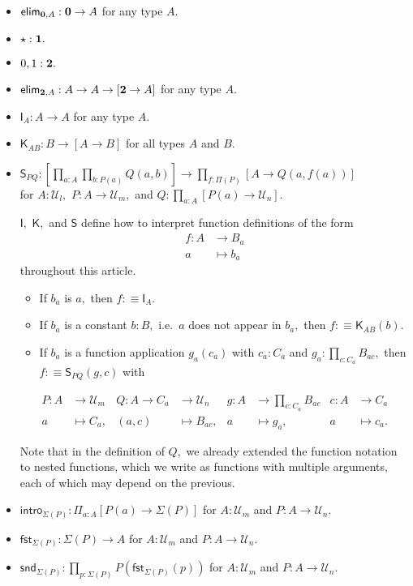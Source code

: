 \documentclass[a4paper]{article}
\theoremstyle{definition}
\theoremstyle{remark}
\let\defeq\equiv
\renewcommand{\equiv}{\simeq}
\newcommand{\univVar}{\mathcal}
\newcommand{\U}{\univVar{U}}
\newcommand{\0}{\primType{0}}
\newcommand{\1}{\primType{1}}
\newcommand{\2}{\primType{2}}
\newcommand{\nm}{\mathsf}
\newcommand{\intro}{\nm{intro}}
\newcommand{\elim}{\nm{elim}}
\newcommand{\fst}{\nm{fst}}
\newcommand{\snd}{\nm{snd}}
\newcommand{\combinator}{\nm}
\newcommand{\idFun}{\combinator{I}}
\newcommand{\constFun}{\combinator{K}}
\newcommand{\revSubstFun}{\combinator{S}}
\begin{document}
\begin{itemize}
  \item $\elim_{\0,A} : \0 \to A$ for any type $A.$

  \item $\star : \1.$

  \item $0,1 : \2.$

  \item $\elim_{\2,A} : A \to A \to [\2 \to A]$ for any type $A.$

  \item $\idFun_A : A \to A$ for any type $A.$

  \item $\constFun_{AB} : B \to [A \to B]$ for all types $A$ and $B.$

  \item $\displaystyle \revSubstFun_{PQ} : \left[\prod_{a : A} \prod_{b : P(a)} Q(a,b)\right] \to \prod_{f : \Pi(P)} [A \to Q(a,f(a))]$\\[1ex]
  for $A : \U_l,$ $P : A \to \U_m,$ and $Q : \prod_{a : A} [P(a) \to \U_n].$

  $\idFun,$ $\constFun,$ and $\revSubstFun$ define how to interpret function definitions of the form
  \begin{align*}
    f : A &\to     B_a\\
        a &\mapsto b_a
  \end{align*}
  throughout this article.
  \begin{itemize}
    \item If $b_a$ is $a,$ then $f :\defeq \idFun_A.$
    \item If $b_a$ is a constant $b : B,$ i.e.\ $a$ does not appear in $b_a,$ then
    $f :\defeq \constFun_{AB}(b).$
    \item If $b_a$ is a function application $g_a(c_a)$ with $c_a : C_a$ and
    $g_a : \prod_{c : C_a} B_{ac},$ then $f :\defeq \revSubstFun_{PQ}(g,c)$ with
  \end{itemize}
  \begin{align*}
    P : A &\to     \U_m & Q : A \to C_a &\to     \U_n   & g : A &\to     \textstyle\prod_{c : C_a} B_{ac} & c : A &\to     C_a\\
        a &\mapsto C_a, &     (a,c)     &\mapsto B_{ac},&     a &\mapsto g_a,                             &     a &\mapsto c_a.
  \end{align*}

  Note that in the definition of $Q,$ we already extended the function notation to nested functions,
  which we write as functions with multiple arguments, each of which may depend on the previous.

  \item $\intro_{\Sigma(P)} : \Pi_{a : A} [P(a) \to \Sigma(P)]$ for $A : \U_m$ and $P : A \to \U_n.$

  \item $\fst_{\Sigma(P)} : \Sigma(P) \to A$ for $A : \U_m$ and $P : A \to \U_n.$

  \item $\snd_{\Sigma(P)} : \prod_{p : \Sigma(P)} P(\fst_{\Sigma(P)}(p))$ for $A : \U_m$ and $P : A \to \U_n.$
\end{itemize}
\end{document}
